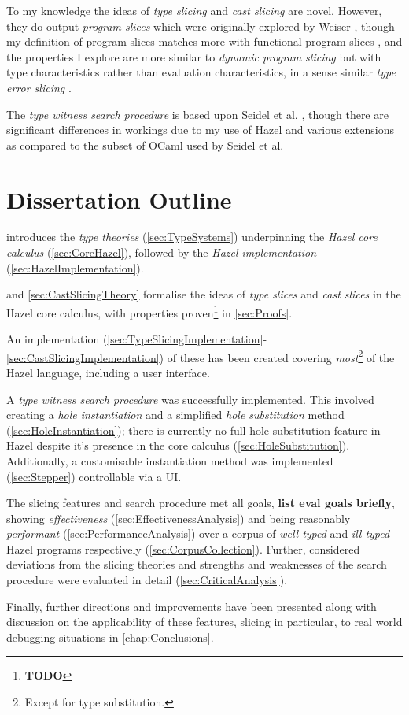 To my knowledge the ideas of \textit{type slicing} and \textit{cast slicing} are novel. However, they do output \textit{program slices} which were originally explored by Weiser \cite{ProgSlice}, though my definition of program slices matches more with functional program slices \cite{FunctionalProgExplain}, and the properties I explore are more similar to \textit{dynamic program slicing} \cite{DynProgSlice} but with type characteristics rather than evaluation characteristics, in a sense similar \textit{type error slicing} \cite{ErrSlice}.

The \textit{type witness search procedure} is	 based upon Seidel et al. \cite{SearchProc}, though there are significant differences in workings due to my use of Hazel and various extensions as compared to the subset of OCaml used by Seidel et al.

\section{Dissertation Outline}
\label{sec:Outline}
 introduces the \textit{type theories} (\cref{sec:TypeSystems}) underpinning the \textit{Hazel core calculus} (\cref{sec:CoreHazel}), followed by the \textit{Hazel implementation} (\cref{sec:HazelImplementation}).

 and \cref{sec:CastSlicingTheory} formalise the ideas of \textit{type slices} and \textit{cast slices} in the Hazel core calculus, with properties proven\footnote{\textbf{TODO}} in \cref{sec:Proofs}. 
 
 An implementation (\cref{sec:TypeSlicingImplementation}-\ref{sec:CastSlicingImplementation}) of these has been created covering \textit{most}\footnote{Except for type substitution.} of the Hazel language, including a user interface. 
 
 A \textit{type witness search procedure} was successfully implemented. This involved creating a \textit{hole instantiation} and a simplified \textit{hole substitution} method (\cref{sec:HoleInstantiation}); there is currently no full hole substitution feature in Hazel despite it's presence in the core calculus (\cref{sec:HoleSubstitution}). Additionally, a customisable instantiation method was implemented (\cref{sec:Stepper}) controllable via a UI.

The slicing features and search procedure met all goals, \textbf{list eval goals briefly}, showing \textit{effectiveness} (\cref{sec:EffectivenessAnalysis}) and being reasonably \textit{performant} (\cref{sec:PerformanceAnalysis}) over a corpus of \textit{well-typed} and \textit{ill-typed} Hazel programs respectively (\cref{sec:CorpusCollection}). Further, considered deviations from the slicing theories and strengths and weaknesses of the search procedure were evaluated in detail (\cref{sec:CriticalAnalysis}).

Finally, further directions and improvements have been presented along with discussion on the applicability of these features, slicing in particular, to real world debugging situations in \cref{chap:Conclusions}.